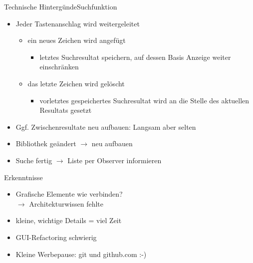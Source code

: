 \documentclass[]{beamer}
\begin{document}
\begin{frame}{Technische Hintergünde}{Suchfunktion}
\begin{itemize}
\item<1-> Jeder Tastenanschlag wird weitergeleitet
  \begin{itemize}
  \item<2-> ein neues Zeichen wird angefügt
      \begin{itemize}
	\item<3-> letztes Suchresultat speichern, auf dessen Basis Anzeige weiter einschränken
      \end{itemize}
    \item<4-> das letzte Zeichen wird gelöscht
      \begin{itemize}
	\item<5-> vorletztes gespeichertes Suchresultat wird an die Stelle des aktuellen Resultats gesetzt
      \end{itemize}
  \end{itemize}
\item<6-> Ggf. Zwischenresultate neu aufbauen: Langsam aber selten
\item<7-> Bibliothek geändert $\rightarrow$ neu aufbauen
\item<8-> Suche fertig  $\rightarrow$  Liste per Observer informieren
\end{itemize}
\end{frame}

\begin{frame}{Erkenntnisse}
\begin{itemize}
 \item Grafische Elemente wie verbinden? \\ $\rightarrow$ Architekturwissen fehlte
 \item kleine, wichtige Details = viel Zeit %
 \item GUI-Refactoring schwierig
 \item Kleine Werbepause: git und github.com :-)
\end{itemize}
\end{frame}
\end{document}
